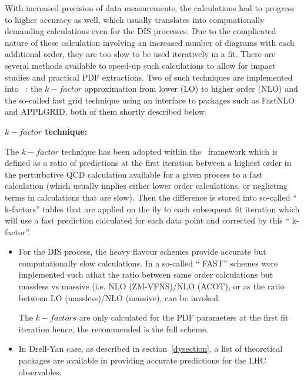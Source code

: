 
With increased precision of data measurements, the calculations had to progress to higher accuracy as well, which usually translates into compuationally demanding calculations even for the DIS processes. Due to the complicated 
nature of these calculation involving an increased number of diagrams with each 
additional order, they are too slow to be used iteratively in a fit.
There are several methods available to speed-up such calculations to allow for impact studies and practical PDF extractions.  Two of such techniques
are implemented into \fitter\ : the $k-factor$ approximation from lower (LO) to higher order (NLO) and the so-called fast grid technique using an interface to packages such as FastNLO and APPLGRID, both of them shortly described below.  


\begin{description}
\item \bf {$k-factor$ technique:} \rm

The $k-factor$ technique has been adopted within the \fitter\ framework which is  
defined as a ratio of predictions at the first iteration between a highest order 
in the perturbative QCD calculation available for a given process to a fast calculation (which usually implies either lower order calculations, or neglicting terms in calculations that are slow). Then the difference is stored into so-called `` k-factors''  tables that are applied on the fly to each subsequent fit iteration which will use a fast prediction calculated for each data point and corrected by this `` k-factor''.

\begin{itemize}
\item For the DIS process, the heavy flavour schemes provide accurate but computationally slow calculations. In \fitter a so-called `` FAST'' schemes were implemented such athat
the ratio between same order calculations but massless vs massive 
(i.e. NLO (ZM-VFNS)/NLO (ACOT), or as the ratio between LO (massless)/NLO (massive),
can be invoked.


The $k-factors$ are only calculated for the PDF parameters at the first fit iteration
hence, the recommended is the full scheme.



\item In Drell-Yan case, as described in section~\ref{dysection}, a list of theoretical packages are available in providing accurate predictions for the LHC observables.



\end{itemize}
\end{description}
